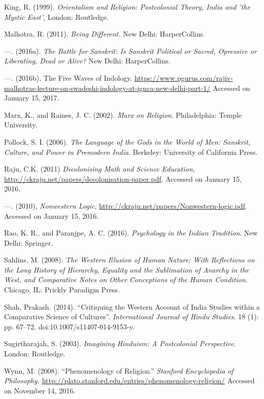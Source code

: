 \begin{thebibliography}{99}
  King, R. (1999). \textit{Orientalism and Religion: Postcolonial Theory, India and 'the Mystic East',} London: Routledge.

  Malhotra, R. (2011). \textit{Being Different.} New Delhi: HarperCollins.

  —. (2016a). \textit{The Battle for Sanskrit: Is Sanskrit Political or Sacred, Opressive or Liberating, Dead or Alive? } New Delhi: HarperCollins.

  —. (2016b). The Five Waves of Indology. \url{https://www.pgurus.com/rajiv-malhotras-lecture-on-swadeshi-indology-at-ignca-new-delhi-part-1/} Accessed on January 15, 2017.

  Marx, K., and Raines, J. C. (2002). \textit{Marx on Religion}. Philadelphia: Temple University.

  Pollock, S. I. (2006). \textit{The Language of the Gods in the World of Men: Sanskrit, Culture, and Power in Premodern India}. Berkeley: University of California Press.

  Raju, C.K. (2011) \textit{Decolonising Math and Science Education}, \url{http://ckraju.net/papers/decolonisation-paper.pdf}. Accessed on January 15, 2016.

  —. (2010), \textit{Nonwestern Logic}, \url{http://ckraju.net/papers/Nonwestern-logic.pdf}. Accessed on January 15, 2016.

  Rao, K. R., and Paranjpe, A. C. (2016). \textit{Psychology in the Indian Tradition}. New Delhi: Springer.

  Sahlins, M. (2008). \textit{The Western Illusion of Human Nature: With Reflections on the Long History of Hierarchy, Equality and the Sublimation of Anarchy in the West, and Comparative Notes on Other Conceptions of the Human Condition}. Chicago, IL: Prickly Paradigm Press.

  Shah, Prakash. (2014). “Critiquing the Western Account of India Studies within a Comparative Science of Cultures”. \textit{International Journal of Hindu Studies}. 18 (1): pp. 67--72. doi:10.1007/s11407-014-9153-y.

  Sugirtharajah, S. (2003). \textit{Imagining Hinduism: A Postcolonial Perspective}. London: Routledge.

  Wynn, M. (2008). “Phenomenology of Religion.” \textit{Stanford Encyclopedia of Philosophy.} \url{http://plato.stanford.edu/entries/phenomenology-religion/} Accessed on November 14, 2016.

 \end{thebibliography}

